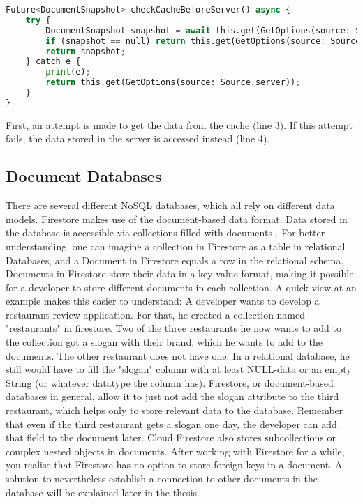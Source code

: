 \begin{lstlisting}[language=Python, caption={Firestore and Dart - getting Cache-data}]
Future<DocumentSnapshot> checkCacheBeforeServer() async {
	try {
		DocumentSnapshot snapshot = await this.get(GetOptions(source: Source.cache));
		if (snapshot == null) return this.get(GetOptions(source: Source.server));
		return snapshot;
	} catch e {
		print(e);
		return this.get(GetOptions(source: Source.server));
	}
}	
\end{lstlisting}
\noindent
First, an attempt is made to get the data from the cache (line 3). If this attempt fails, the data stored in the server is accessed instead (line 4).

\subsection{Document Databases}
There are several different NoSQL databases, which all rely on different data models. Firestore makes use of the document-based data format. Data stored in the database is accessible via collections filled with documents \cite{.firestore}. For better understanding, one can imagine a collection in Firestore as a table in relational Databases, and a Document in Firestore equals a row in the relational schema. Documents in Firestore store their data in a key-value format, making it possible for a developer to store different documents in each collection. A quick view at an example makes this easier to understand: A developer wants to develop a restaurant-review application. For that, he created a collection named "restaurants" in firestore. Two of the three restaurants he now wants to add to the collection got a slogan with their brand, which he wants to add to the documents. The other restaurant does not have one. In a relational database, he still would have to fill the "slogan" column with at least NULL-data or an empty String (or whatever datatype the column has). Firestore, or document-based databases in general, allow it to just not add the slogan attribute to the third restaurant, which helps only to store relevant data to the database. Remember that even if the third restaurant gets a slogan one day, the developer can add that field to the document later. Cloud Firestore also stores subcollections or complex nested objects in documents. After working with Firestore for a while, you realise that Firestore has no option to store foreign keys in a document. A solution to nevertheless establish a connection to other documents in the database will be explained later in the thesis.